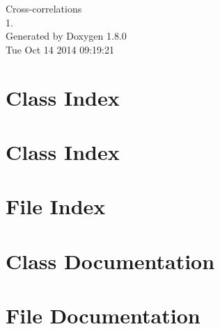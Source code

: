 \documentclass{book}
\begin{document}
\hypersetup{pageanchor=false,citecolor=blue}
\begin{titlepage}
\vspace*{7cm}
\begin{center}
{\Large Cross-\/correlations \\[1ex]\large 1. }\\
\vspace*{1cm}
{\large Generated by Doxygen 1.8.0}\\
\vspace*{0.5cm}
{\small Tue Oct 14 2014 09:19:21}\\
\end{center}
\end{titlepage}
\clearemptydoublepage
{}
\tableofcontents
\clearemptydoublepage
{}
\hypersetup{pageanchor=true,citecolor=blue}
\chapter{Class Index}

\chapter{Class Index}

\chapter{File Index}

\chapter{Class Documentation}
















\chapter{File Documentation}


































\printindex
\end{document}
